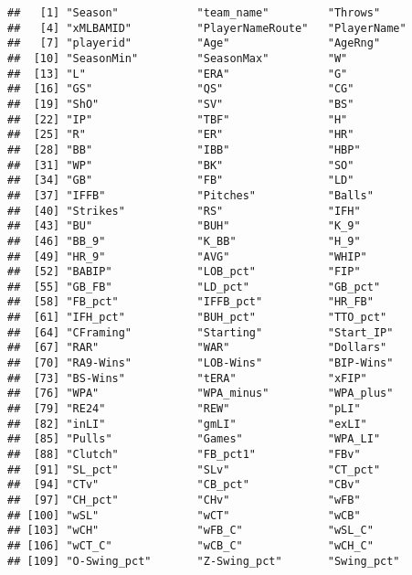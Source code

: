 \documentclass[
]{article}
\begin{document}
\begin{verbatim}
##   [1] "Season"            "team_name"         "Throws"           
##   [4] "xMLBAMID"          "PlayerNameRoute"   "PlayerName"       
##   [7] "playerid"          "Age"               "AgeRng"           
##  [10] "SeasonMin"         "SeasonMax"         "W"                
##  [13] "L"                 "ERA"               "G"                
##  [16] "GS"                "QS"                "CG"               
##  [19] "ShO"               "SV"                "BS"               
##  [22] "IP"                "TBF"               "H"                
##  [25] "R"                 "ER"                "HR"               
##  [28] "BB"                "IBB"               "HBP"              
##  [31] "WP"                "BK"                "SO"               
##  [34] "GB"                "FB"                "LD"               
##  [37] "IFFB"              "Pitches"           "Balls"            
##  [40] "Strikes"           "RS"                "IFH"              
##  [43] "BU"                "BUH"               "K_9"              
##  [46] "BB_9"              "K_BB"              "H_9"              
##  [49] "HR_9"              "AVG"               "WHIP"             
##  [52] "BABIP"             "LOB_pct"           "FIP"              
##  [55] "GB_FB"             "LD_pct"            "GB_pct"           
##  [58] "FB_pct"            "IFFB_pct"          "HR_FB"            
##  [61] "IFH_pct"           "BUH_pct"           "TTO_pct"          
##  [64] "CFraming"          "Starting"          "Start_IP"         
##  [67] "RAR"               "WAR"               "Dollars"          
##  [70] "RA9-Wins"          "LOB-Wins"          "BIP-Wins"         
##  [73] "BS-Wins"           "tERA"              "xFIP"             
##  [76] "WPA"               "WPA_minus"         "WPA_plus"         
##  [79] "RE24"              "REW"               "pLI"              
##  [82] "inLI"              "gmLI"              "exLI"             
##  [85] "Pulls"             "Games"             "WPA_LI"           
##  [88] "Clutch"            "FB_pct1"           "FBv"              
##  [91] "SL_pct"            "SLv"               "CT_pct"           
##  [94] "CTv"               "CB_pct"            "CBv"              
##  [97] "CH_pct"            "CHv"               "wFB"              
## [100] "wSL"               "wCT"               "wCB"              
## [103] "wCH"               "wFB_C"             "wSL_C"            
## [106] "wCT_C"             "wCB_C"             "wCH_C"            
## [109] "O-Swing_pct"       "Z-Swing_pct"       "Swing_pct"        

\end{verbatim}
\end{document}
